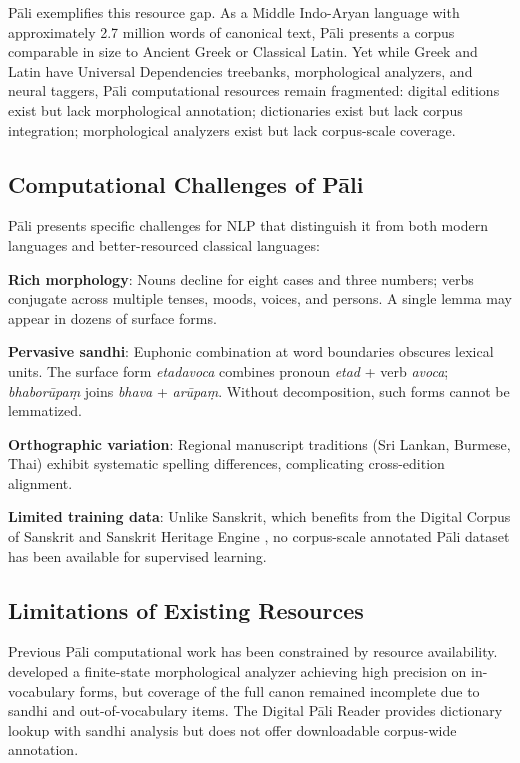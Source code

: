 \documentclass[11pt,twocolumn]{article}
\begin{document}
Pāli exemplifies this resource gap. As a Middle Indo-Aryan language with approximately 2.7 million words of canonical text, Pāli presents a corpus comparable in size to Ancient Greek or Classical Latin. Yet while Greek and Latin have Universal Dependencies treebanks, morphological analyzers, and neural taggers, Pāli computational resources remain fragmented: digital editions exist but lack morphological annotation; dictionaries exist but lack corpus integration; morphological analyzers exist but lack corpus-scale coverage.

\subsection{Computational Challenges of Pāli}

Pāli presents specific challenges for NLP that distinguish it from both modern languages and better-resourced classical languages:

\textbf{Rich morphology}: Nouns decline for eight cases and three numbers; verbs conjugate across multiple tenses, moods, voices, and persons. A single lemma may appear in dozens of surface forms.

\textbf{Pervasive sandhi}: Euphonic combination at word boundaries obscures lexical units. The surface form \emph{etadavoca} combines pronoun \emph{etad} + verb \emph{avoca}; \emph{bhaborūpaṃ} joins \emph{bhava} + \emph{arūpaṃ}. Without decomposition, such forms cannot be lemmatized.

\textbf{Orthographic variation}: Regional manuscript traditions (Sri Lankan, Burmese, Thai) exhibit systematic spelling differences, complicating cross-edition alignment.

\textbf{Limited training data}: Unlike Sanskrit, which benefits from the Digital Corpus of Sanskrit \citep{hellwig2010} and Sanskrit Heritage Engine \citep{huet2005,goyal2012}, no corpus-scale annotated Pāli dataset has been available for supervised learning.

\subsection{Limitations of Existing Resources}

Previous Pāli computational work has been constrained by resource availability. \citet{alfter2017} developed a finite-state morphological analyzer achieving high precision on in-vocabulary forms, but coverage of the full canon remained incomplete due to sandhi and out-of-vocabulary items. The Digital Pāli Reader \citep{yuttadhammo2013} provides dictionary lookup with sandhi analysis but does not offer downloadable corpus-wide annotation.
\end{document}
